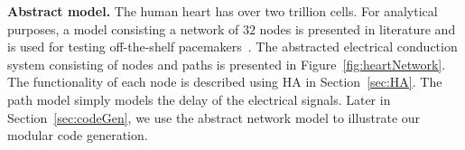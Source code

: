 \noindent \textbf{Abstract model.}
The human heart has over two trillion cells. For analytical purposes, a
model consisting  a network of  $32$ nodes is presented in literature
and is used for testing off-the-shelf pacemakers~\cite{chen14,zhihao12}.
The abstracted electrical conduction system consisting  of 
nodes and paths is presented in Figure~\ref{fig:heartNetwork}.
The functionality of each node is described using \acf{HA} in Section~\ref{sec:HA}. The path model simply models the delay 
of the electrical signals.
Later in Section~\ref{sec:codeGen}, we use the abstract network model 
to illustrate our modular code generation.

 
